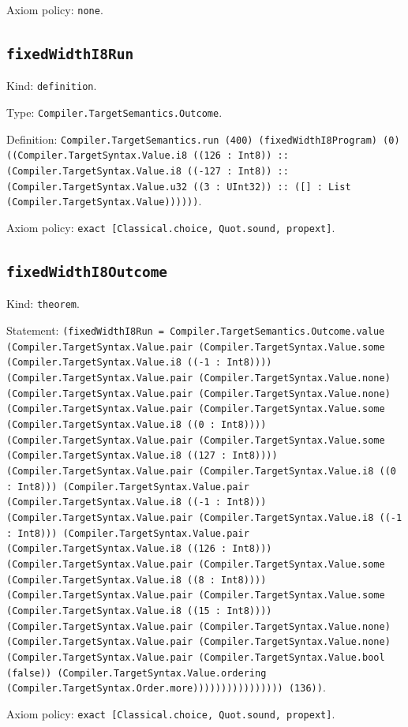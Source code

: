 \documentclass[11pt]{article}
\begin{document}
\noindent Axiom policy: \texttt{none}.\par
\subsection*{\texttt{fixedWidthI8Run}}
\noindent Kind: \texttt{definition}.\par
\noindent Type: \texttt{Compiler.TargetSemantics.Outcome}.\par
\noindent Definition: \texttt{Compiler.TargetSemantics.run (400) (fixedWidthI8Program) (0) ((Compiler.TargetSyntax.Value.i8 ((126 : Int8)) :: (Compiler.TargetSyntax.Value.i8 ((-127 : Int8)) :: (Compiler.TargetSyntax.Value.u32 ((3 : UInt32)) :: ([] : List (Compiler.TargetSyntax.Value))))))}.\par
\noindent Axiom policy: \texttt{exact [Classical.choice, Quot.sound, propext]}.\par
\subsection*{\texttt{fixedWidthI8Outcome}}
\noindent Kind: \texttt{theorem}.\par
\noindent Statement: \texttt{(fixedWidthI8Run = Compiler.TargetSemantics.Outcome.value (Compiler.TargetSyntax.Value.pair (Compiler.TargetSyntax.Value.some (Compiler.TargetSyntax.Value.i8 ((-1 : Int8)))) (Compiler.TargetSyntax.Value.pair (Compiler.TargetSyntax.Value.none) (Compiler.TargetSyntax.Value.pair (Compiler.TargetSyntax.Value.none) (Compiler.TargetSyntax.Value.pair (Compiler.TargetSyntax.Value.some (Compiler.TargetSyntax.Value.i8 ((0 : Int8)))) (Compiler.TargetSyntax.Value.pair (Compiler.TargetSyntax.Value.some (Compiler.TargetSyntax.Value.i8 ((127 : Int8)))) (Compiler.TargetSyntax.Value.pair (Compiler.TargetSyntax.Value.i8 ((0 : Int8))) (Compiler.TargetSyntax.Value.pair (Compiler.TargetSyntax.Value.i8 ((-1 : Int8))) (Compiler.TargetSyntax.Value.pair (Compiler.TargetSyntax.Value.i8 ((-1 : Int8))) (Compiler.TargetSyntax.Value.pair (Compiler.TargetSyntax.Value.i8 ((126 : Int8))) (Compiler.TargetSyntax.Value.pair (Compiler.TargetSyntax.Value.some (Compiler.TargetSyntax.Value.i8 ((8 : Int8)))) (Compiler.TargetSyntax.Value.pair (Compiler.TargetSyntax.Value.some (Compiler.TargetSyntax.Value.i8 ((15 : Int8)))) (Compiler.TargetSyntax.Value.pair (Compiler.TargetSyntax.Value.none) (Compiler.TargetSyntax.Value.pair (Compiler.TargetSyntax.Value.none) (Compiler.TargetSyntax.Value.pair (Compiler.TargetSyntax.Value.bool (false)) (Compiler.TargetSyntax.Value.ordering (Compiler.TargetSyntax.Order.more)))))))))))))))) (136))}.\par
\noindent Axiom policy: \texttt{exact [Classical.choice, Quot.sound, propext]}.\par
\end{document}
